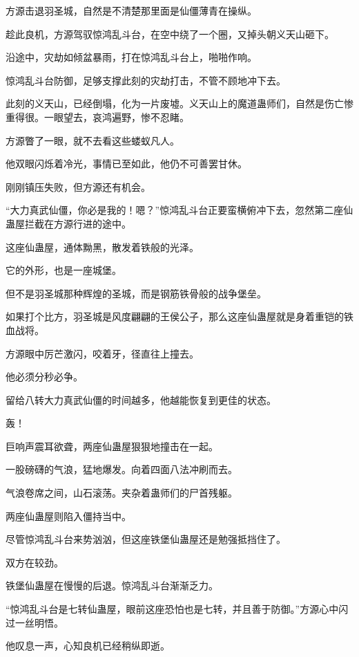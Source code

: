 
\begin{this_body}

方源击退羽圣城，自然是不清楚那里面是仙僵薄青在操纵。

趁此良机，方源驾驭惊鸿乱斗台，在空中绕了一个圈，又掉头朝义天山砸下。

沿途中，灾劫如倾盆暴雨，打在惊鸿乱斗台上，啪啪作响。

惊鸿乱斗台防御，足够支撑此刻的灾劫打击，不管不顾地冲下去。

此刻的义天山，已经倒塌，化为一片废墟。义天山上的魔道蛊师们，自然是伤亡惨重得很。一眼望去，哀鸿遍野，惨不忍睹。

方源瞥了一眼，就不去看这些蝼蚁凡人。

他双眼闪烁着冷光，事情已至如此，他仍不可善罢甘休。

刚刚镇压失败，但方源还有机会。

“大力真武仙僵，你必是我的！嗯？”惊鸿乱斗台正要蛮横俯冲下去，忽然第二座仙蛊屋拦截在方源行进的途中。

这座仙蛊屋，通体黝黑，散发着铁般的光泽。

它的外形，也是一座城堡。

但不是羽圣城那种辉煌的圣城，而是钢筋铁骨般的战争堡垒。

如果打个比方，羽圣城是风度翩翩的王侯公子，那么这座仙蛊屋就是身着重铠的铁血战将。

方源眼中厉芒激闪，咬着牙，径直往上撞去。

他必须分秒必争。

留给八转大力真武仙僵的时间越多，他越能恢复到更佳的状态。

轰！

巨响声震耳欲聋，两座仙蛊屋狠狠地撞击在一起。

一股磅礴的气浪，猛地爆发。向着四面八法冲刷而去。

气浪卷席之间，山石滚荡。夹杂着蛊师们的尸首残躯。

两座仙蛊屋则陷入僵持当中。

尽管惊鸿乱斗台来势汹汹，但这座铁堡仙蛊屋还是勉强抵挡住了。

双方在较劲。

铁堡仙蛊屋在慢慢的后退。惊鸿乱斗台渐渐乏力。

“惊鸿乱斗台是七转仙蛊屋，眼前这座恐怕也是七转，并且善于防御。”方源心中闪过一丝明悟。

他叹息一声，心知良机已经稍纵即逝。


\end{this_body}
